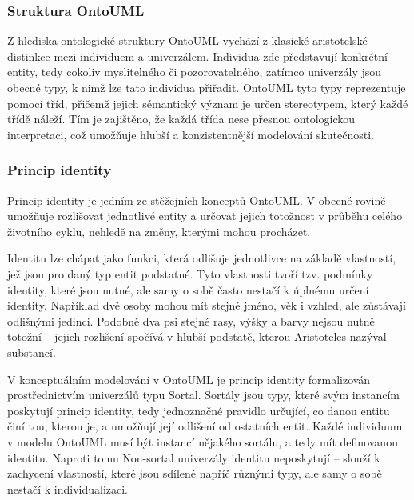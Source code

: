 
\subsubsection{Struktura OntoUML}
\label{sec:ontouml-struktura}
Z hlediska ontologické struktury OntoUML vychází z klasické aristotelské distinkce mezi individuem a univerzálem. Individua zde představují konkrétní entity, tedy cokoliv myslitelného či pozorovatelného, zatímco univerzály jsou obecné typy, k nimž lze tato individua přiřadit. OntoUML tyto typy reprezentuje pomocí tříd, přičemž jejich sémantický význam je určen stereotypem, který každé třídě náleží. Tím je zajištěno, že každá třída nese přesnou ontologickou interpretaci, což umožňuje hlubší a konzistentnější modelování skutečnosti. \cite{Guizzardi2005}


\subsubsection{Princip identity}
\label{sec:princip-identity}
Princip identity je jedním ze stěžejních konceptů OntoUML. V obecné rovině umožňuje rozlišovat jednotlivé entity a určovat jejich totožnost v průběhu celého životního cyklu, nehledě na změny, kterými mohou procházet. \cite{Guizzardi2005,Fuetscher1930}

Identitu lze chápat jako funkci, která odlišuje jednotlivce na základě vlastností, jež jsou pro daný typ entit podstatné. Tyto vlastnosti tvoří tzv. podmínky identity, které jsou nutné, ale samy o sobě často nestačí k úplnému určení identity. Například dvě osoby mohou mít stejné jméno, věk i vzhled, ale zůstávají odlišnými jedinci. Podobně dva psi stejné rasy, výšky a barvy nejsou nutně totožní – jejich rozlišení spočívá v hlubší podstatě, kterou Aristoteles nazýval substancí. \cite{Guizzardi2005}

V konceptuálním modelování v OntoUML je princip identity formalizován prostřednictvím univerzálů typu Sortal. Sortály jsou typy, které svým instancím poskytují princip identity, tedy jednoznačné pravidlo určující, co danou entitu činí tou, kterou je, a umožňují její odlišení od ostatních entit. Každé individuum v modelu OntoUML musí být instancí nějakého sortálu, a tedy mít definovanou identitu. Naproti tomu Non-sortal univerzály identitu neposkytují – slouží k zachycení vlastností, které jsou sdílené napříč různými typy, ale samy o sobě nestačí k individualizaci. \cite{Guizzardi2005,Guizzardi2015,Ruy2017}

